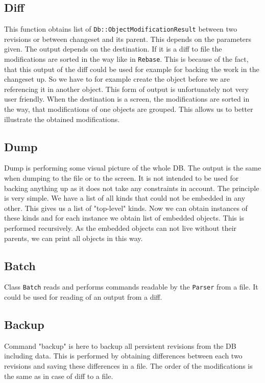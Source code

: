 \documentclass[deska]{subfiles}
\begin{document}
\subsection{Diff}

This function obtains list of {\tt Db::ObjectModificationResult} between two revisions or between changeset and its parent.
This depends on the parameters given. The output depends on the destination. If it is a diff to file the modifications
are sorted in the way like in {\tt Rebase}. This is because of the fact, that this output of the diff could be used for
example for backing the work in the changeset up. So we have to for example create the object before we are referencing it
in another object. This form of output is unfortunately not very user friendly. When the destination is a screen, the
modifications are sorted in the way, that modifications of one objects are grouped. This allows us to better illustrate
the obtained modifications.

\subsection{Dump}

Dump is performing some visual picture of the whole DB. The output is the same when dumping to the file or to the screen.
It is not intended to be used for backing anything up as it does not take any constraints in account.
The principle is very simple. We have a list of all kinds that could not be embedded in any other. This gives us a list
of "top-level" kinds. Now we can obtain instances of these kinds and for each instance we obtain list of embedded objects.
This is performed recursively. As the embedded objects can not live without their parents, we can print all objects in this way.

\subsection{Batch}

Class {\tt Batch} reads and performs commands readable by the {\tt Parser} from a file. It could be used for reading of
an output from a diff.

\subsection{Backup}

Command "backup" is here to backup all persistent revisions from the DB including data. This is performed by obtaining
differences between each two revisions and saving these differences in a file. The order of the modifications is the same
as in case of diff to a file.
\end{document}

